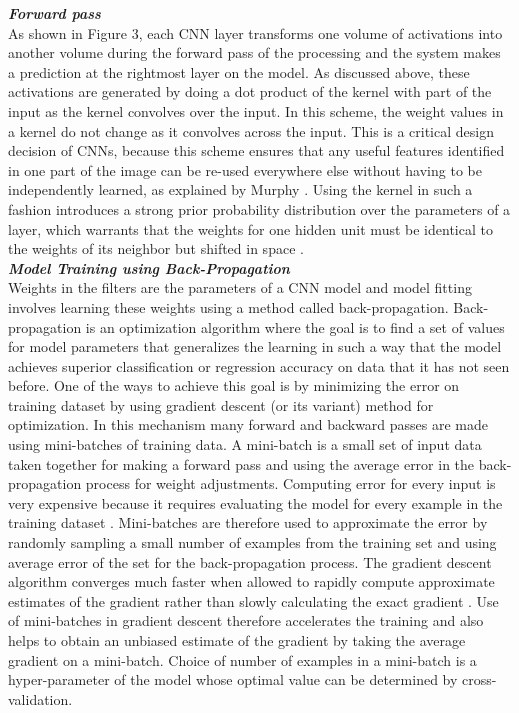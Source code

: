 \documentclass [11pt,letterpaper ,twoside ,openany ]{report}
\begin{document}
    \noindent
    \textbf{\textit{Forward pass}}\\
    As shown in Figure 3, each CNN layer transforms one volume of activations into another volume during the forward pass of the processing and the system makes a prediction at the rightmost layer on the model. As discussed above, these activations are generated by doing a dot product of the kernel with part of the input as the kernel convolves over the input. In this scheme, the weight values in a kernel do not change as it convolves across the input. This is a critical design decision of CNNs, because this scheme ensures that any useful features identified in one part of the image can be re-used everywhere else without having to be independently learned, as explained by Murphy \cite{Murphy2012}. Using the kernel in such a fashion introduces a strong prior probability distribution over the parameters of a layer, which warrants that the weights for one hidden unit must be identical to the weights of its neighbor but shifted in space \cite{Goodfellow-et-al-2016}.\\

    \noindent
    \textbf{\textit{Model Training using Back-Propagation}} \\
    Weights in the filters are the parameters of a CNN model and model fitting involves learning these weights using a method called back-propagation. Back-propagation is an optimization algorithm where the goal is to find a set of values for model parameters that generalizes the learning in such a way that the model achieves superior classification or regression accuracy on data that it has not seen before. One of the ways to achieve this goal is by minimizing the error on training dataset by using gradient descent (or its variant) method for optimization. In this mechanism many forward and backward passes are made using mini-batches of training data. A mini-batch is a small set of input data taken together for making a forward pass and using the average error in the back-propagation process for weight adjustments. Computing error for every input is very expensive because it requires evaluating the model for every example in the training dataset \cite{Goodfellow-et-al-2016}. Mini-batches are therefore used to approximate the error by randomly sampling a small number of examples from the training set and using average error of the set for the back-propagation process. The gradient descent algorithm converges much faster when allowed to rapidly compute approximate estimates of the gradient rather than slowly calculating the exact gradient \cite{Goodfellow-et-al-2016}. Use of mini-batches in gradient descent therefore accelerates the training and also helps to obtain an unbiased estimate of the gradient by taking the average gradient on a mini-batch. Choice of number of examples in a mini-batch is a hyper-parameter of the model whose optimal value can be determined by cross-validation.
\end{document}

